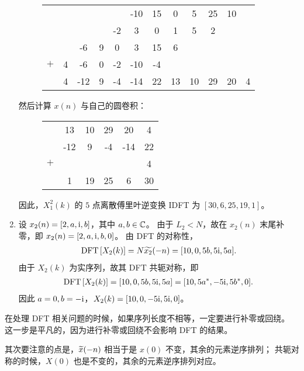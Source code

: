 \begin{solution}
\begin{enumerate}[label=(\arabic*)]
\begin{figure}[H]
\begin{tabular}{c c c c c c c c c c c c}
                    & & & & & -10 & 15 & 0 & 5 & 25 & 10 \\
                    & & & & -2 & 3 & 0 & 1 & 5 & 2 \\
                    & & -6 & 9 & 0 & 3 & 15 & 6 \\
                    $+$ & 4 & -6 & 0 & -2 & -10 & -4 \\
                    \hline
                    & 4 & -12 & 9 & -4 & -14 & 22 & 13 & 10 & 29 & 20 & 4
                \end{tabular}
            \end{figure}
            然后计算 $x(n)$ 与自己的圆卷积：
            \begin{figure}[H]
                \centering
                \begin{tabular}{c c c c c c}
                    & 13 & 10 & 29 & 20 & 4 \\
                    & -12 & 9 & -4 & -14 & 22 \\
                    $+$ & & & & & 4 \\
                    \hline
                    & 1 & 19 & 25 & 6 & 30
                \end{tabular}
            \end{figure}
            因此，$X_1^2(k)$ 的 $5$ 点离散傅里叶逆变换 IDFT 为 $[30, 6, 25, 19, 1]$。
        \item 设 $x_2(n) = [2, a, \mathrm{i}, b]$，其中 $a, b \in \mathbb{C}$。
            由于 $L_2 < N$，故在 $x_2(n)$ 末尾补零，即 $x_2(n) = [2, a, \mathrm{i}, b, 0]$。
            由 DFT 的对称性，
            \begin{align*}
                \mathrm{DFT}\left[X_2(k)\right] = N\widetilde{x_2}(-n) = [10, 0, 5b, 5\mathrm{i}, 5a].
            \end{align*}
            由于 $X_2(k)$ 为实序列，故其 DFT 共轭对称，即
            \begin{align*}
                \mathrm{DFT}\left[X_2(k)\right] = [10, 0, 5b, 5\mathrm{i}, 5a] = [10, 5a^*, -5\mathrm{i}, 5b^*, 0].
            \end{align*}
            因此 $a = 0, b = -\mathrm{i}$，$X_2(k) = [10, 0, -5\mathrm{i}, 5\mathrm{i}, 0]$。
    \end{enumerate}
\end{solution}

\begin{note}
    在处理 DFT 相关问题的时候，如果序列长度不相等，一定要进行补零或回绕。
    这一步是平凡的，因为进行补零或回绕不会影响 DFT 的结果。

    其次要注意的点是，$\widetilde{x}(-n)$ 相当于是 $x(0)$ 不变，其余的元素逆序排列；
    共轭对称的时候，$X(0)$ 也是不变的，其余的元素逆序排列对应。
\end{note}

